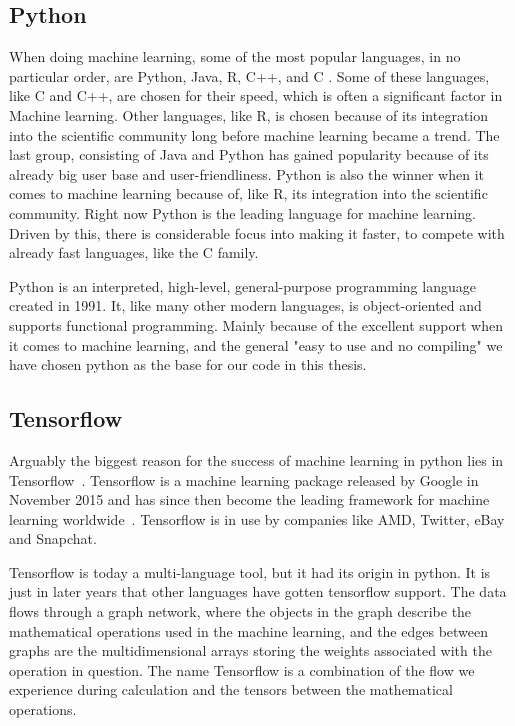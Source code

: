 \subsection{Python}
When doing machine learning, some of the most popular languages, in no particular order, are Python, Java, R, C++, and C \cite{kaggle}. Some of these languages, like C and C++, are chosen for their speed, which is often a significant factor in Machine learning. Other languages, like R, is chosen because of its integration into the scientific community long before machine learning became a trend. The last group, consisting of Java and Python has gained popularity because of its already big user base and user-friendliness. Python is also the winner when it comes to machine learning because of, like R, its integration into the scientific community. 
Right now Python is the leading language for machine learning. Driven by this, there is considerable focus into making it faster, to compete with already fast languages, like the C family. 

Python is an interpreted, high-level, general-purpose programming language created in 1991.   It, like many other modern languages, is object-oriented and supports functional programming. 
Mainly because of the excellent support when it comes to machine learning, and the general "easy to use and no compiling" we have chosen python as the base for our code in this thesis. 



\subsection{Tensorflow}
Arguably the biggest reason for the success of machine learning in python lies in Tensorflow~\cite{tensorflow2015-whitepaper}. Tensorflow is a machine learning package released by Google in November 2015 and has since then become the leading framework for machine learning worldwide~\cite{kaggle}.  
Tensorflow is in use by companies like AMD, Twitter, eBay and Snapchat. 


Tensorflow is today a multi-language tool, but it had its origin in python. It is just in later years that other languages have gotten tensorflow support.  
The data flows through a graph network, where the objects in the graph describe the mathematical operations used in the machine learning, and the edges between graphs are the multidimensional arrays storing the weights associated with the operation in question. The name Tensorflow is a combination of the flow we experience during calculation and the tensors between the mathematical operations. 

